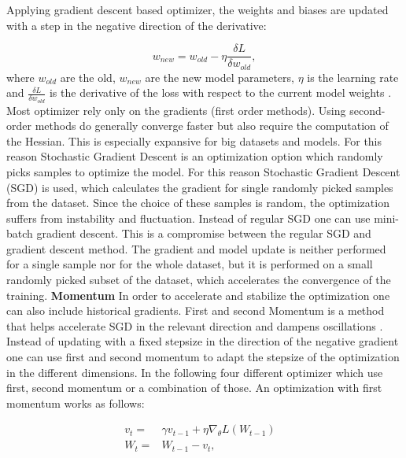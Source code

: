 Applying gradient descent based optimizer, the weights and biases are updated with a step in the negative direction of the derivative:

\begin{equation}
  w_{new} = w_{old} - \eta \frac{\delta L}{\delta w_{old}},
\end{equation}
where $w_{old}$ are the old, $w_{new}$ are the new model parameters, $\eta$ is the learning rate and $\frac{\delta L}{\delta w_{old}}$ is the derivative of the loss with respect to the current model weights \cite{ShilohPerl2020}. 
Most optimizer rely only on the gradients (first order methods). Using second-order methods do generally converge faster but also require the computation of the Hessian. This is especially expansive for big datasets and models. For this reason Stochastic Gradient Descent is an optimization option which randomly picks samples to optimize the model. For this reason Stochastic Gradient Descent (SGD) is used, which calculates the gradient for single randomly picked samples from the dataset. Since the choice of these samples is random, the optimization suffers from instability and fluctuation. Instead of regular SGD one can use mini-batch gradient descent. This is a compromise between the regular SGD and gradient descent method. The gradient and model update is neither performed for a single sample nor for the whole dataset, but it is performed on a small randomly picked subset of the dataset, which accelerates the convergence of the training.\newline
\newline
\textbf{Momentum}\newline
In order to accelerate and stabilize the optimization one can also include historical gradients. First and second Momentum is a method that helps accelerate SGD in the relevant direction and dampens oscillations \cite{ShilohPerl2020} . Instead of updating with a fixed stepsize in the direction of the negative gradient one can use first and second momentum to adapt the stepsize of the optimization in the different dimensions. In the following four different optimizer which use first, second momentum or a combination of those. An optimization with first momentum works as follows:

\begin{equation}
  \begin{aligned}
  v_{t} = & \gamma v_{t-1} +  \eta \nabla_{\theta}L(W_{t-1}) &\\
  W_{t} = &W_{t-1} - v_{t},
  \end{aligned}
  \label{eq:moment}
\end{equation}

